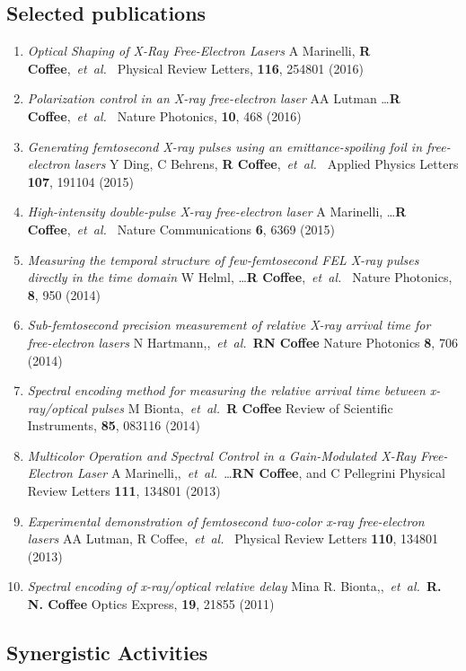 \documentclass[letterpaper,oneside,11pt]{article}
\newcommand{\etal}{,~\textit{et~al.~}}
\begin{document}
\subsection*{Selected publications}
\begin{enumerate}
\item \textit{Optical Shaping of X-Ray Free-Electron Lasers}
A Marinelli, \textbf{R Coffee}\etal
Physical Review Letters, \textbf{116}, 254801 (2016)
\item \textit{Polarization control in an X-ray free-electron laser}
AA Lutman \dots \textbf{R Coffee}\etal 
Nature Photonics, \textbf{10}, 468 (2016)
\item \textit{Generating femtosecond X-ray pulses using an emittance-spoiling foil in free-electron lasers}
Y Ding, C Behrens, \textbf{R Coffee}\etal
Applied Physics Letters \textbf{107}, 191104 (2015)
\item \textit{High-intensity double-pulse X-ray free-electron laser}
A Marinelli, \ldots \textbf{R Coffee}\etal
Nature Communications \textbf{6}, 6369 (2015)
\item \textit{Measuring the temporal structure of few-femtosecond FEL X-ray pulses directly in the time domain}
W Helml, \ldots \textbf{R Coffee}\etal
Nature Photonics, \textbf{8}, 950 (2014)
\item \textit{Sub-femtosecond precision measurement of relative X-ray arrival time for free-electron lasers}
N Hartmann,\etal \textbf{RN Coffee}
Nature Photonics \textbf{8}, 706 (2014)
\item \textit{Spectral encoding method for measuring the relative arrival time between x-ray/optical pulses}
M Bionta\etal \textbf{R Coffee}
Review of Scientific Instruments, \textbf{85}, 083116 (2014)
\item \textit{Multicolor Operation and Spectral Control in a Gain-Modulated X-Ray Free-Electron Laser}
A Marinelli,\etal\ldots \textbf{RN Coffee}, and C Pellegrini
Physical Review Letters \textbf{111}, 134801 (2013)
\item \textit{Experimental demonstration of femtosecond two-color x-ray free-electron lasers}
AA Lutman, R Coffee\etal
Physical Review Letters \textbf{110}, 134801 (2013)
\item \textit{Spectral encoding of x-ray/optical relative delay}
Mina R. Bionta,\etal \textbf{R. N. Coffee}
Optics Express, \textbf{19}, 21855 (2011)
\end{enumerate}


\subsection*{Synergistic Activities}
\end{document}
